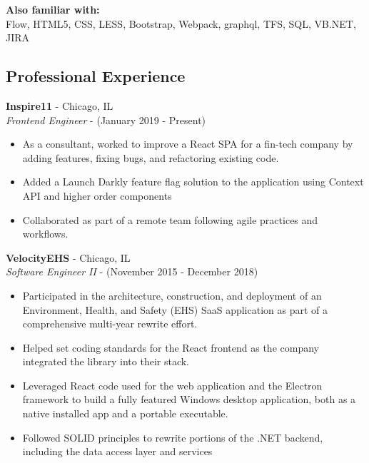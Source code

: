 \documentclass[12pt]{article}
\begin{document}
\begin{paracol}{2}
\noindent \textbf{Also familiar with:}\\
Flow, HTML5, CSS, LESS, Bootstrap, Webpack, graphql, TFS, SQL, VB.NET, JIRA

\switchcolumn 

\subsection*{Professional Experience} 

\textbf{Inspire11} - Chicago, IL \\
\textit{Frontend Engineer} - {\footnotesize{(January 2019 - Present)}} 
\begin{itemize}
    \setlength\itemsep{0.1em}
    \item{\footnotesize{As a consultant, worked to improve a React SPA for a fin-tech company by adding features, fixing bugs, and refactoring existing code.}}
    \item {\footnotesize{Added a Launch Darkly feature flag solution to the application using Context API and higher order components}}
    \item {\footnotesize{Collaborated as part of a remote team following agile practices and workflows.}}
\end{itemize} 

\noindent \textbf{VelocityEHS} - Chicago, IL \\
\textit{Software Engineer II} - {\footnotesize{(November 2015 - December 2018)}}
\begin{itemize}
    \setlength\itemsep{0.1em}
    \item {\footnotesize{Participated in the architecture, construction, and deployment of an Environment, Health, and Safety (EHS) SaaS application as part of a comprehensive multi-year rewrite effort.}}
    \item {\footnotesize{Helped set coding standards for the React frontend as the company integrated the library into their stack.}}
    \item {\footnotesize{Leveraged React code used for the web application and the Electron framework to build a fully featured Windows desktop application, both as a native installed app and a portable executable.}}
    \item {\footnotesize{Followed SOLID principles to rewrite portions of the .NET backend, including the data access layer and services}}
\end{itemize} 


\end{paracol}
\end{document}

